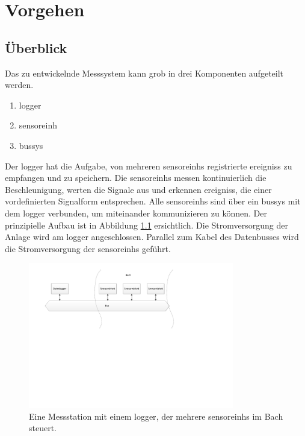 %
%

\chapter{Vorgehen}\label{chap.vorgehen}
\section{Überblick}\label{sec.ueberblick}
Das zu entwickelnde Messsystem kann grob in drei Komponenten aufgeteilt werden. 
\begin{enumerate}
\item \gls{logger}
\item \gls{sensoreinh}
\item \gls{bussys}
\end{enumerate}
Der \gls{logger} hat die Aufgabe, von mehreren \glspl{sensoreinh} registrierte \glspl{ereignis} zu empfangen und zu speichern. Die \glspl{sensoreinh} messen kontinuierlich die Beschleunigung, werten die Signale aus und erkennen \glspl{ereignis}, die einer vordefinierten Signalform entsprechen. Alle \glspl{sensoreinh} sind über ein \gls{bussys} mit dem \gls{logger} verbunden, um miteinander kommunizieren zu können. Der prinzipielle Aufbau ist in Abbildung \ref{fig.situationskroki} ersichtlich. Die Stromversorgung der Anlage wird am \gls{logger} angeschlossen. Parallel zum Kabel des Datenbusses wird die Stromversorgung der \glspl{sensoreinh} geführt.

\begin{figure}
	\centering
		\includegraphics[width=0.8\textwidth]{images/visio/Situationskroki.pdf}
	\caption{Eine Messstation mit einem \gls{logger}, der mehrere \glspl{sensoreinh} im Bach steuert.}
	\label{fig.situationskroki}
\end{figure}

